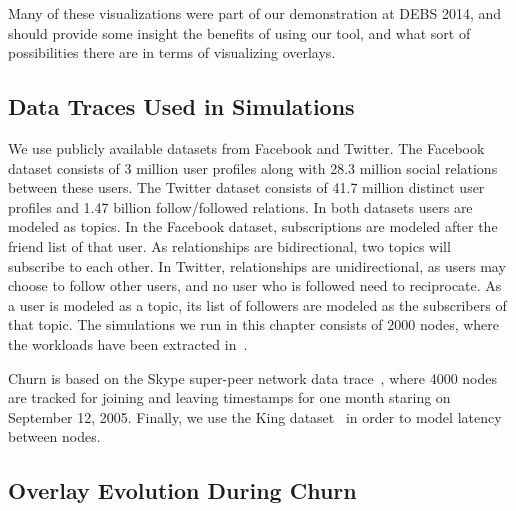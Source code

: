Many of these visualizations were part of our demonstration at
DEBS 2014, and should provide some insight the benefits of using
our tool, and what sort of possibilities there are in terms of
visualizing overlays.

\subsection{Data Traces Used in Simulations}

We use publicly available datasets from
Facebook\cite{facebook-eurosys09} and Twitter\cite{Kwak10www}. The Facebook
dataset consists of 3 million user profiles along with 28.3 million
social relations between these users. The Twitter dataset consists of
41.7 million distinct user profiles and 1.47 billion follow/followed
relations. In both datasets users are modeled as topics. In the Facebook
dataset, subscriptions are modeled after the friend list of that user.
As relationships are bidirectional, two topics will subscribe to each
other. In Twitter, relationships are unidirectional, as users may choose
to follow other users, and no user who is followed need to reciprocate.
As a user is modeled as a topic, its list of followers are modeled as
the subscribers of that topic. The simulations we run in this chapter
consists of 2000 nodes, where the workloads have been extracted in~\cite{Setty:2012}.

Churn is based on the Skype super-peer network data
trace~\cite{Guha:2006}, where 4000 nodes are tracked for joining and
leaving timestamps for one month staring on September 12, 2005. Finally,
we use the King dataset~\cite{king} in order to model latency between
nodes.

\subsection{Overlay Evolution During Churn}
\label{sec:churn}

